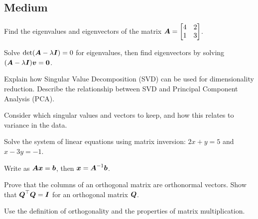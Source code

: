 \subsection*{Medium}

\begin{exercisebox}[medium]
\begin{problem}
Find the eigenvalues and eigenvectors of the matrix $\boldsymbol{A} = \begin{bmatrix} 4 & 2 \\ 1 & 3 \end{bmatrix}$.
\end{problem}
\begin{hintbox}
Solve $\det(\boldsymbol{A} - \lambda \boldsymbol{I}) = 0$ for eigenvalues, then find eigenvectors by solving $(\boldsymbol{A} - \lambda \boldsymbol{I})\boldsymbol{v} = \boldsymbol{0}$.
\end{hintbox}
\end{exercisebox}


\begin{exercisebox}[medium]
\begin{problem}
Explain how Singular Value Decomposition (SVD) can be used for dimensionality reduction. Describe the relationship between SVD and Principal Component Analysis (PCA).
\end{problem}
\begin{hintbox}
Consider which singular values and vectors to keep, and how this relates to variance in the data.
\end{hintbox}
\end{exercisebox}


\begin{exercisebox}[medium]
\begin{problem}
Solve the system of linear equations using matrix inversion: $2x + y = 5$ and $x - 3y = -1$.
\end{problem}
\begin{hintbox}
Write as $\boldsymbol{A}\boldsymbol{x} = \boldsymbol{b}$, then $\boldsymbol{x} = \boldsymbol{A}^{-1}\boldsymbol{b}$.
\end{hintbox}
\end{exercisebox}


\begin{exercisebox}[medium]
\begin{problem}
Prove that the columns of an orthogonal matrix are orthonormal vectors. Show that $\boldsymbol{Q}^\top\boldsymbol{Q} = \boldsymbol{I}$ for an orthogonal matrix $\boldsymbol{Q}$.
\end{problem}
\begin{hintbox}
Use the definition of orthogonality and the properties of matrix multiplication.
\end{hintbox}
\end{exercisebox}


